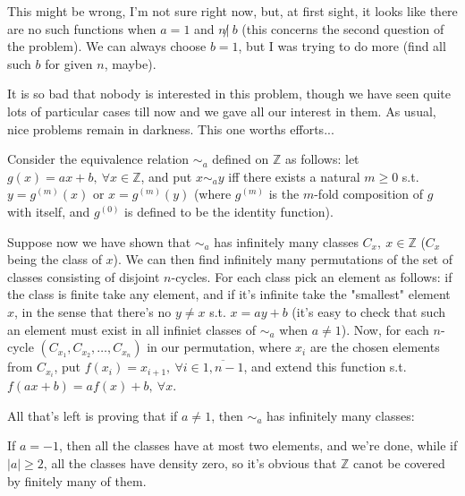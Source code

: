 \begin{solution}
	This might be wrong, I'm not sure right now, but, at first sight, it looks like there are no such functions when $a=1$ and $n\not|\ b$ (this concerns the second question of the problem). We can always choose $b=1$, but I was trying to do more (find all such $b$ for given $n$, maybe).
\end{solution}



\begin{solution}
	It is so bad that nobody is interested in this problem, though we have seen quite lots of particular cases till now and we gave all our interest in them. As usual, nice problems remain in darkness. This one worths efforts...
\end{solution}



\begin{solution}
	Consider the equivalence relation $\sim_a$ defined on $\mathbb Z$ as follows: let $g(x)=ax+b,\ \forall x\in\mathbb Z$, and put $x\sim_ay$ iff there exists a natural $m\ge 0$ s.t. $y=g^{(m)}(x)$ or $x=g^{(m)}(y)$ (where $g^{(m)}$ is the $m$-fold composition of $g$ with itself, and $g^{(0)}$ is defined to be the identity function).

Suppose now we have shown that $\sim_a$ has infinitely many classes $C_x,\ x\in\mathbb Z$ ($C_x$ being the class of $x$). We can then find infinitely many permutations of the set of classes consisting of disjoint $n$-cycles. For each class pick an element as follows: if the class is finite take any element, and if it's infinite take the "smallest" element $x$, in the sense that there's no $y\ne x$ s.t. $x=ay+b$ (it's easy to check that such an element must exist in all infiniet classes of $\sim_a$ when $a\ne 1$). Now, for each $n$-cycle $(C_{x_1},C_{x_2},\ldots,C_{x_n})$ in our permutation, where $x_i$ are the chosen elements from $C_{x_i}$, put $f(x_i)=x_{i+1},\ \forall i\in\overline{1,n-1}$, and extend this function s.t. $f(ax+b)=af(x)+b,\ \forall x$.

All that's left is proving that if $a\ne 1$, then $\sim_a$ has infinitely many classes:

If $a=-1$, then all the classes have at most two elements, and we're done, while if $|a|\ge 2$, all the classes have density zero, so it's obvious that $\mathbb Z$ canot be covered by finitely many of them.
\end{solution}



